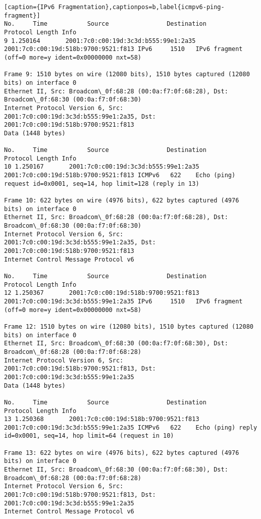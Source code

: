 \begin{lstlisting}[caption={IPv6 Fragmentation},captionpos=b,label{icmpv6-ping-fragment}]
No.     Time           Source                Destination           Protocol Length Info
9 1.250164       2001:7c0:c00:19d:3c3d:b555:99e1:2a35 2001:7c0:c00:19d:518b:9700:9521:f813 IPv6     1510   IPv6 fragment (off=0 more=y ident=0x00000000 nxt=58)

Frame 9: 1510 bytes on wire (12080 bits), 1510 bytes captured (12080 bits) on interface 0
Ethernet II, Src: Broadcom\_0f:68:28 (00:0a:f7:0f:68:28), Dst: Broadcom\_0f:68:30 (00:0a:f7:0f:68:30)
Internet Protocol Version 6, Src: 2001:7c0:c00:19d:3c3d:b555:99e1:2a35, Dst: 2001:7c0:c00:19d:518b:9700:9521:f813
Data (1448 bytes)

No.     Time           Source                Destination           Protocol Length Info
10 1.250167       2001:7c0:c00:19d:3c3d:b555:99e1:2a35 2001:7c0:c00:19d:518b:9700:9521:f813 ICMPv6   622    Echo (ping) request id=0x0001, seq=14, hop limit=128 (reply in 13)

Frame 10: 622 bytes on wire (4976 bits), 622 bytes captured (4976 bits) on interface 0
Ethernet II, Src: Broadcom\_0f:68:28 (00:0a:f7:0f:68:28), Dst: Broadcom\_0f:68:30 (00:0a:f7:0f:68:30)
Internet Protocol Version 6, Src: 2001:7c0:c00:19d:3c3d:b555:99e1:2a35, Dst: 2001:7c0:c00:19d:518b:9700:9521:f813
Internet Control Message Protocol v6

No.     Time           Source                Destination           Protocol Length Info
12 1.250367       2001:7c0:c00:19d:518b:9700:9521:f813 2001:7c0:c00:19d:3c3d:b555:99e1:2a35 IPv6     1510   IPv6 fragment (off=0 more=y ident=0x00000000 nxt=58)

Frame 12: 1510 bytes on wire (12080 bits), 1510 bytes captured (12080 bits) on interface 0
Ethernet II, Src: Broadcom\_0f:68:30 (00:0a:f7:0f:68:30), Dst: Broadcom\_0f:68:28 (00:0a:f7:0f:68:28)
Internet Protocol Version 6, Src: 2001:7c0:c00:19d:518b:9700:9521:f813, Dst: 2001:7c0:c00:19d:3c3d:b555:99e1:2a35
Data (1448 bytes)

No.     Time           Source                Destination           Protocol Length Info
13 1.250368       2001:7c0:c00:19d:518b:9700:9521:f813 2001:7c0:c00:19d:3c3d:b555:99e1:2a35 ICMPv6   622    Echo (ping) reply id=0x0001, seq=14, hop limit=64 (request in 10)

Frame 13: 622 bytes on wire (4976 bits), 622 bytes captured (4976 bits) on interface 0
Ethernet II, Src: Broadcom\_0f:68:30 (00:0a:f7:0f:68:30), Dst: Broadcom\_0f:68:28 (00:0a:f7:0f:68:28)
Internet Protocol Version 6, Src: 2001:7c0:c00:19d:518b:9700:9521:f813, Dst: 2001:7c0:c00:19d:3c3d:b555:99e1:2a35
Internet Control Message Protocol v6
\end{lstlisting}
